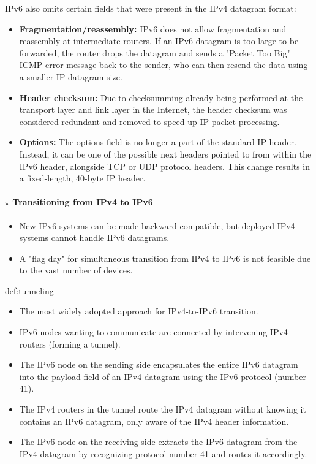 \noindent IPv6 also omits certain fields that were present in the IPv4 datagram format:
\begin{itemize}
    \item \textbf{Fragmentation/reassembly:} IPv6 does not allow fragmentation and reassembly at intermediate routers. If an IPv6 datagram is too large to be forwarded, the router drops the datagram and sends a "Packet Too Big" ICMP error message back to the sender, who can then resend the data using a smaller IP datagram size.

    \item \textbf{Header checksum:} Due to checksumming already being performed at the transport layer and link layer in the Internet, the header checksum was considered redundant and removed to speed up IP packet processing.

    \item \textbf{Options:} The options field is no longer a part of the standard IP header. Instead, it can be one of the possible next headers pointed to from within the IPv6 header, alongside TCP or UDP protocol headers. This change results in a fixed-length, 40-byte IP header.
\end{itemize}

\paragraph[4.4.5.1 Transitioning from IPv4 to IPv6]{$\pmb{\star}$ Transitioning from IPv4 to IPv6}\mbox{}

\begin{itemize}
    \item New IPv6 systems can be made backward-compatible, but deployed IPv4 systems cannot handle IPv6 datagrams.
    \item A "flag day" for simultaneous transition from IPv4 to IPv6 is not feasible due to the vast number of devices.
\end{itemize}

\begin{theo}{def:tunneling}\label{def:tunneling}
    \begin{itemize}[nolistsep,noitemsep]
        \item The most widely adopted approach for IPv4-to-IPv6 transition.
        \item IPv6 nodes wanting to communicate are connected by intervening IPv4 routers (forming a tunnel).
        \item The IPv6 node on the sending side encapsulates the entire IPv6 datagram into the payload field of an IPv4 datagram using the IPv6 protocol (number 41).
        \item The IPv4 routers in the tunnel route the IPv4 datagram without knowing it contains an IPv6 datagram, only aware of the IPv4 header information.
        \item The IPv6 node on the receiving side extracts the IPv6 datagram from the IPv4 datagram by recognizing protocol number 41 and routes it accordingly.
    \end{itemize}
\end{theo}

